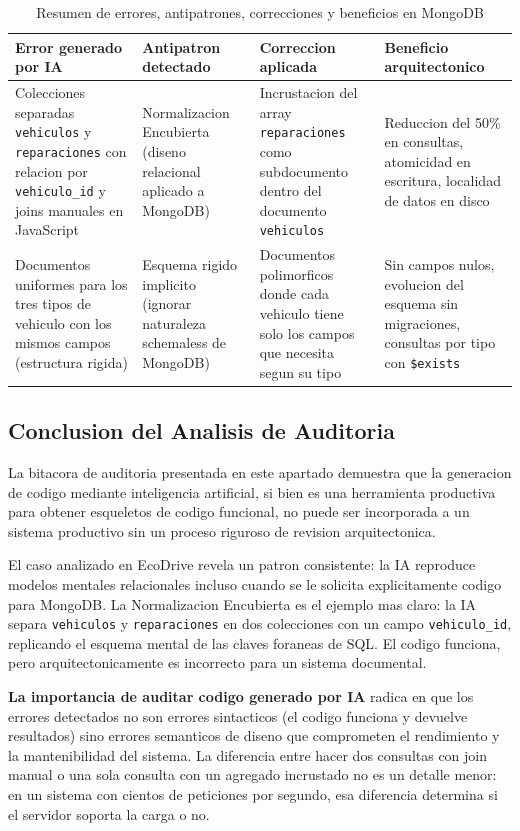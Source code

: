 \begin{table}[h]
\centering
\begin{tabular}{|p{4cm}|p{4cm}|p{4cm}|p{4cm}|}
\hline
\textbf{Error generado por IA} & \textbf{Antipatron detectado} & \textbf{Correccion aplicada} & \textbf{Beneficio arquitectonico} \\
\hline
Colecciones separadas \texttt{vehiculos} y \texttt{reparaciones} con relacion por \texttt{vehiculo\_id} y joins manuales en JavaScript & Normalizacion Encubierta (diseno relacional aplicado a MongoDB) & Incrustacion del array \texttt{reparaciones} como subdocumento dentro del documento \texttt{vehiculos} & Reduccion del 50\% en consultas, atomicidad en escritura, localidad de datos en disco \\
\hline
Documentos uniformes para los tres tipos de vehiculo con los mismos campos (estructura rigida) & Esquema rigido implicito (ignorar naturaleza schemaless de MongoDB) & Documentos polimorficos donde cada vehiculo tiene solo los campos que necesita segun su tipo & Sin campos nulos, evolucion del esquema sin migraciones, consultas por tipo con \texttt{\$exists} \\
\hline
\end{tabular}
\caption{Resumen de errores, antipatrones, correcciones y beneficios en MongoDB}
\end{table}

\newpage

\subsection{Conclusion del Analisis de Auditoria}

La bitacora de auditoria presentada en este apartado demuestra que la generacion de codigo mediante inteligencia artificial, si bien es una herramienta productiva para obtener esqueletos de codigo funcional, no puede ser incorporada a un sistema productivo sin un proceso riguroso de revision arquitectonica.

El caso analizado en EcoDrive revela un patron consistente: la IA reproduce modelos mentales relacionales incluso cuando se le solicita explicitamente codigo para MongoDB. La Normalizacion Encubierta es el ejemplo mas claro: la IA separa \texttt{vehiculos} y \texttt{reparaciones} en dos colecciones con un campo \texttt{vehiculo\_id}, replicando el esquema mental de las claves foraneas de SQL. El codigo funciona, pero arquitectonicamente es incorrecto para un sistema documental.

\textbf{La importancia de auditar codigo generado por IA} radica en que los errores detectados no son errores sintacticos (el codigo funciona y devuelve resultados) sino errores semanticos de diseno que comprometen el rendimiento y la mantenibilidad del sistema. La diferencia entre hacer dos consultas con join manual o una sola consulta con un agregado incrustado no es un detalle menor: en un sistema con cientos de peticiones por segundo, esa diferencia determina si el servidor soporta la carga o no.

